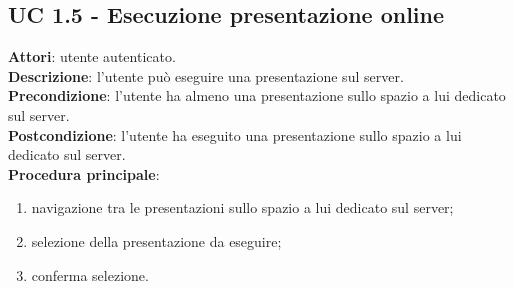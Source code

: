 \subsection{UC 1.5 - Esecuzione presentazione online}{
\textbf{Attori}: utente autenticato.\\
	\textbf{Descrizione}: l'utente può eseguire una presentazione sul server.\\
	\textbf{Precondizione}: l'utente ha almeno una presentazione sullo spazio a lui dedicato sul server.\\
	\textbf{Postcondizione}: l'utente ha eseguito una presentazione sullo spazio a lui dedicato sul server.\\
	\textbf{Procedura principale}:
	\begin{enumerate}
		\item navigazione tra le presentazioni sullo spazio a lui dedicato sul server;
		\item selezione della presentazione da eseguire;
		\item conferma selezione.
	\end{enumerate}
}